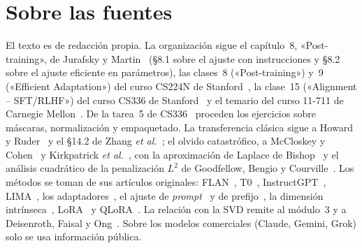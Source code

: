 \documentclass[11pt,a4paper,twoside,openany]{book}
\begin{document}
\section*{Sobre las fuentes}
El texto es de redacción propia. La organización sigue el capítulo~8, «Post-training», de Jurafsky y Martin~\cite{jm3} (§8.1 sobre el ajuste con instrucciones y §8.2 sobre el ajuste eficiente en parámetros), las clases~8 («Post-training») y~9 («Efficient Adaptation») del curso CS224N de Stanford~\cite{cs224n}, la clase~15 («Alignment -- SFT/RLHF») del curso CS336 de Stanford~\cite{cs336} y el temario del curso 11-711 de Carnegie Mellon~\cite{cmu711}. De la tarea~5 de CS336~\cite{cs336a5,cs336a5s} proceden los ejercicios sobre máscaras, normalización y empaquetado. La transferencia clásica sigue a Howard y Ruder~\cite{howard-ruder} y el §14.2 de Zhang \emph{et al.}~\cite{d2l}; el olvido catastrófico, a McCloskey y Cohen~\cite{mccloskey} y Kirkpatrick \emph{et al.}~\cite{kirkpatrick}, con la aproximación de Laplace de Bishop~\cite[§4.4]{bishop} y el análisis cuadrático de la penalización $L^{2}$ de Goodfellow, Bengio y Courville~\cite[§7.1.1]{gbc}. Los métodos se toman de sus artículos originales: FLAN~\cite{wei-flan}, T0~\cite{sanh-t0}, InstructGPT~\cite{ouyang}, LIMA~\cite{zhou-lima}, los adaptadores~\cite{houlsby}, el ajuste de \emph{prompt}~\cite{lester} y de prefijo~\cite{li-liang}, la dimensión intrínseca~\cite{li-intrinsic,aghajanyan}, LoRA~\cite{hu-lora} y QLoRA~\cite{dettmers}. La relación con la SVD remite al módulo~3 y a Deisenroth, Faisal y Ong~\cite[cap.~4]{mml}. Sobre los modelos comerciales (Claude, Gemini, Grok) solo se usa información pública.
\end{document}
